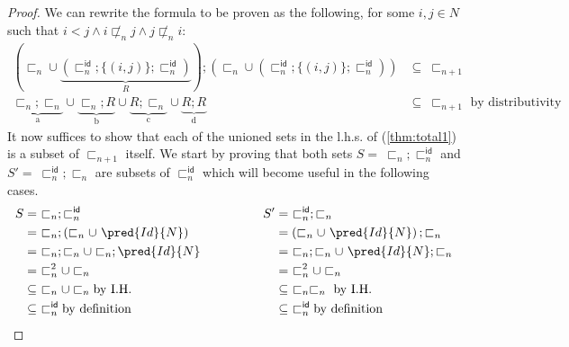 \begin{lem}
{\begin{proof}
	We can rewrite the formula to be proven as the following, for some $i, j \in N$ such that $i < j \land i \not\sqsubset_n j \land j \not\sqsubset_n i$:
	\begin{align}
		\left( \sqsubset_n \cup \underbrace{\left( \sqsubset_n^\mathsf{id} ; \{ (i, j) \} ; \sqsubset_n^\mathsf{id} \right)}_{R} \right) ; \left( \sqsubset_n \cup \left( \sqsubset_n^\mathsf{id} ; \{ (i, j) \} ; \sqsubset_n^\mathsf{id} \right) \right) &\subseteq\ \sqsubset_{n + 1} \\
		\label{thm:total1}
		\underbrace{\sqsubset_n ; \sqsubset_n}_{\text{a}}
			\cup
		\underbrace{\sqsubset_n ; R}_{\text{b}}
			\cup
		\underbrace{R ; \sqsubset_n}_{\text{c}}
			\cup
		\underbrace{R ; R}_{\text{d}}
			&\subseteq\ \sqsubset_{n + 1} \text{ by distributivity}
	\end{align}
	It now suffices to show that each of the unioned sets in the l.h.s. of (\ref{thm:total1}) is a subset of $\sqsubset_{n + 1}$ itself. We start by proving that both sets $S =\ \sqsubset_n ; \sqsubset_n^\mathsf{id}$ and $S' =\ \sqsubset_n^\mathsf{id} ; \sqsubset_n$ are subsets of $\sqsubset_n^\mathsf{id}$ which will become useful in the following cases.
	\[
		\begin{array}{l @{\hspace{50pt}} l}
			\begin{aligned}
				S  &=\ \sqsubset_n ; \sqsubset_n^\mathsf{id} \\
					&=\ \sqsubset_n ; \left( \sqsubset_n \cup\ \pred{Id}{N} \right) \\
					&=\ \sqsubset_n ; \sqsubset_n \cup \sqsubset_n ; \pred{Id}{N} \\
					&=\ \sqsubset_n^2 \cup \sqsubset_n \\
					&\subseteq\ \sqsubset_n \cup \sqsubset_n \text{by I.H.} \\
					&\subseteq\ \sqsubset_n^\mathsf{id} \text{by definition}
				\end{aligned}
				&
				\begin{aligned}
					S' &=\ \sqsubset_n^\mathsf{id} ; \sqsubset_n \\
					&= \left( \sqsubset_n \cup\ \pred{Id}{N} \right) ; \sqsubset_n \\
					&=\ \sqsubset_n ; \sqsubset_n \cup\ \pred{Id}{N} ; \sqsubset_n \\
					&=\ \sqsubset_n^2 \cup \sqsubset_n \\
					&\subseteq\ \sqsubset_n \sqsubset_n \text{ by I.H.} \\
					&\subseteq\ \sqsubset_n^\mathsf{id} \text{by definition}

\end{aligned}
\end{array}\]
\end{proof}}
\end{lem}
